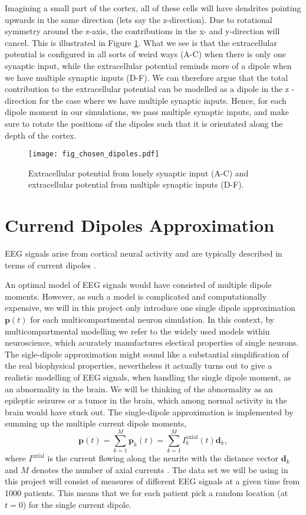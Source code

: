 \documentclass[a4paper, UKenglish, 11pt]{uiomaster}
\begin{document}
Imagining a small part of the cortex, all of these cells will have dendrites pointing upwards in the same direction (lets say the z-direction). Due to rotational symmetry around the z-axis, the contributions in the x- and y-direction will cancel. This is illustrated in Figure \ref{fig:EP}. What we see is that the extracellular potential is configured in all sorts of weird ways (A-C) when there is only one synaptic input, while the extracellular potential reminds more of a dipole when we have multiple synaptic inputs (D-F). We can therefore argue that the total contribution to the extracellular potential can be modelled as a dipole in the z -direction for the case where we have multiple synaptic inputs. Hence, for each dipole moment in our simulations, we pass multiple synaptic inputs, and make sure to rotate the positions of the dipoles such that it is orientated along the depth of the cortex.


\begin{figure}[H]
    \centering
    \texttt{[image: fig\_chosen\_dipoles.pdf]}
    \caption{Extracellular potential from lonely synaptic input (A-C) and extracellular potential from multiple synaptic inputs (D-F).}
    \label{fig:EP}
\end{figure}


\section{Currend Dipoles Approximation}
EEG signals arise from cortical neural activity and are typically described in terms of current dipoles \cite{95}.

An optimal model of EEG signals would have consisted of multiple dipole moments. However, as such a model is complicated and computationally expensive, we will in this project only introduce one single dipole approximation $\textbf{p}(t)$ for each multicompartmental neuron simulation. In this context, by  multicompartmental modelling we refer to the widely used models within neuroscience, which acurately manufactures electical properties of single neurons. The sigle-dipole approximation might sound like a substantial simplification of the real biophysical properties, nevertheless it actually turns out to give a realistic modelling of EEG signals, when handling the single dipole moment, as an abnormality in the brain. We will be thinking of the abnormality as an epileptic seizures or a tumor in the brain, which among normal activity in the brain would have stuck out. The single-dipole approximation is implemented by summing up the multiple current dipole moments,
\begin{equation*}
    \textbf{p}(t) = \sum_{k=1}^M \textbf{p}_k(t) = \sum_{k=1}^M I_k^{\text{axial}}(t)\textbf{d}_k,
\end{equation*}
where $I^{\text{axial}}$ is the current flowing along the neurite with the distance vector $\textbf{d}_k$ and $M$ denotes the number of axial currents \cite{95}. The data set we will be using in this project will consist of measures of different EEG signals at a given time from 1000 patients. This means that we for each patient pick a random location (at $t=0$) for the single current dipole.
\end{document}
